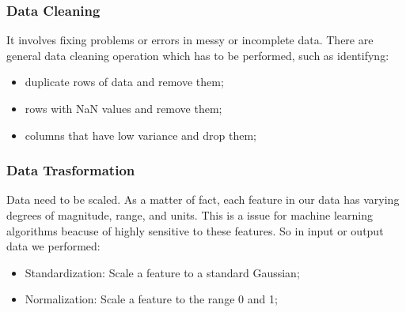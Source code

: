 \subsubsection{Data Cleaning}
It involves fixing problems or errors in messy or incomplete data. There are general data cleaning operation which has to be performed, such as identifyng:
\begin{itemize}
\item duplicate rows of data and remove them;
\item rows with NaN values and remove them;
\item columns that have low variance and drop them;
\end{itemize}
\subsubsection{Data Trasformation}
Data need to be scaled. As a matter of fact, each feature in our data has varying degrees of magnitude, range, and units. This is a issue for machine learning algorithms beacuse of highly sensitive to these features. So in input or output data we performed:
\begin{itemize}
\item Standardization: Scale a feature to a standard Gaussian;
\item Normalization: Scale a feature to the range 0 and 1;
\end{itemize}
